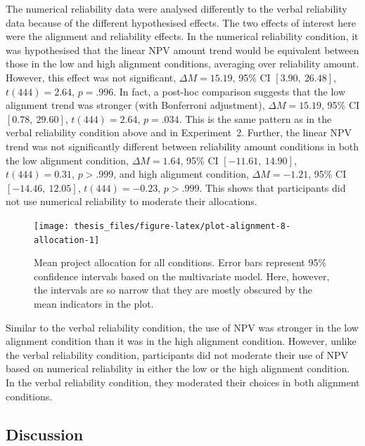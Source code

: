 \documentclass[a4paper, nobind, dvipsnames]{templates/ociamthesis}
\theoremstyle{definition}
\theoremstyle{definition}
\theoremstyle{definition}
\theoremstyle{definition}
\theoremstyle{remark}
\begin{document}
The numerical reliability data were analysed differently to the verbal
reliability data because of the different hypothesised effects. The two effects
of interest here were the alignment and reliability effects. In the numerical
reliability condition, it was hypothesised that the linear NPV amount trend
would be equivalent between those in the low and high alignment conditions,
averaging over reliability amount. However, this effect was not significant,
\(\Delta M = 15.19\), 95\% CI \([3.90,~26.48]\), \(t(444) = 2.64\), \(p = .996\). In
fact, a post-hoc comparison suggests that the low alignment trend was stronger
(with Bonferroni adjustment),
\(\Delta M = 15.19\), 95\% CI \([0.78,~29.60]\), \(t(444) = 2.64\), \(p = .034\). This is
the same pattern as in the verbal reliability condition above and in
Experiment~2. Further, the linear NPV trend was not significantly different
between reliability amount conditions in both the low alignment condition,
\(\Delta M = 1.64\), 95\% CI \([-11.61,~14.90]\), \(t(444) = 0.31\), \(p > .999\),
and high alignment condition,
\(\Delta M = -1.21\), 95\% CI \([-14.46,~12.05]\), \(t(444) = -0.23\), \(p > .999\).
This shows that participants did not use numerical reliability to moderate their
allocations.



\begin{figure}
\texttt{[image: thesis\_files/figure-latex/plot-alignment-8-allocation-1]} \caption{Mean project allocation for all conditions. Error bars represent 95\% confidence intervals based on the multivariate model. Here, however, the intervals are so narrow that they are mostly obscured by the mean indicators in the plot.}\label{fig:plot-alignment-8-allocation}
\end{figure}

Similar to the verbal reliability condition, the use of NPV was stronger in the
low alignment condition than it was in the high alignment condition. However,
unlike the verbal reliability condition, participants did not moderate their use
of NPV based on numerical reliability in either the low or the high alignment
condition. In the verbal reliability condition, they moderated their choices in
both alignment conditions.

\subsection{Discussion}
\end{document}
